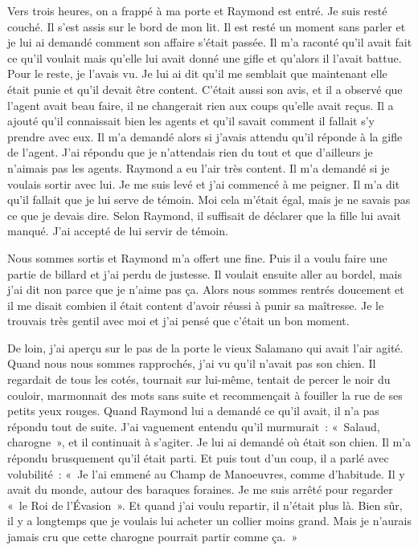 \documentclass[french,twoside]{book} %
\begin{document}
Vers trois heures, on a frappé à ma porte et Raymond est entré. Je suis resté couché. Il s’est assis sur le bord de mon lit. Il est resté un moment sans parler et je lui ai demandé comment son affaire s’était passée. Il m’a raconté qu’il avait fait ce qu’il voulait mais qu’elle lui avait donné une gifle et qu’alors il l’avait battue. Pour le reste, je l’avais vu. Je lui ai dit qu’il me semblait que maintenant elle était punie et qu’il devait être content. C'était aussi son avis, et il a observé que l’agent avait beau faire, il ne changerait rien aux coups qu’elle avait reçus. Il a ajouté qu’il connaissait bien les agents et qu’il savait comment il fallait s’y prendre avec eux. Il m’a demandé alors si j’avais attendu qu’il réponde à la gifle de l’agent. J'ai répondu que je n’attendais rien du tout et que d’ailleurs je n’aimais pas les agents. Raymond a eu l’air très content. Il m’a demandé si je voulais sortir avec lui. Je me suis levé et j’ai commencé à me peigner. Il m’a dit qu’il fallait que je lui serve de témoin. Moi cela m’était égal, mais je ne savais pas ce que je devais dire. Selon Raymond, il suffisait de déclarer que la fille lui avait manqué. J'ai accepté de lui servir de témoin.\par
Nous sommes sortis et Raymond m’a offert une fine. Puis il a voulu faire une partie de billard et j’ai perdu de justesse. Il voulait ensuite aller au bordel, mais j’ai dit non parce que je n’aime pas ça. Alors nous sommes rentrés doucement et il me disait combien il était content d’avoir réussi à punir sa maîtresse. Je le trouvais très gentil avec moi et j’ai pensé que c’était un bon moment.\par
De loin, j’ai aperçu sur le pas de la porte le vieux Salamano qui avait l’air agité. Quand nous nous sommes rapprochés, j’ai vu qu’il n’avait pas son chien. Il regardait de tous les cotés, tournait sur lui-même, tentait de percer le noir du couloir, marmonnait des mots sans suite et recommençait à fouiller la rue de ses petits yeux rouges. Quand Raymond lui a demandé ce qu’il avait, il n’a pas répondu tout de suite. J'ai vaguement entendu qu’il murmurait : « Salaud, charogne », et il continuait à s’agiter. Je lui ai demandé où était son chien. Il m’a répondu brusquement qu’il était parti. Et puis tout d’un coup, il a parlé avec volubilité : « Je l’ai emmené au Champ de Manoeuvres, comme d’habitude. Il y avait du monde, autour des baraques foraines. Je me suis arrêté pour regarder « le Roi de l’Évasion ». Et quand j’ai voulu repartir, il n’était plus là. Bien sûr, il y a longtemps que je voulais lui acheter un collier moins grand. Mais je n’aurais jamais cru que cette charogne pourrait partir comme ça. »\par
\end{document}
